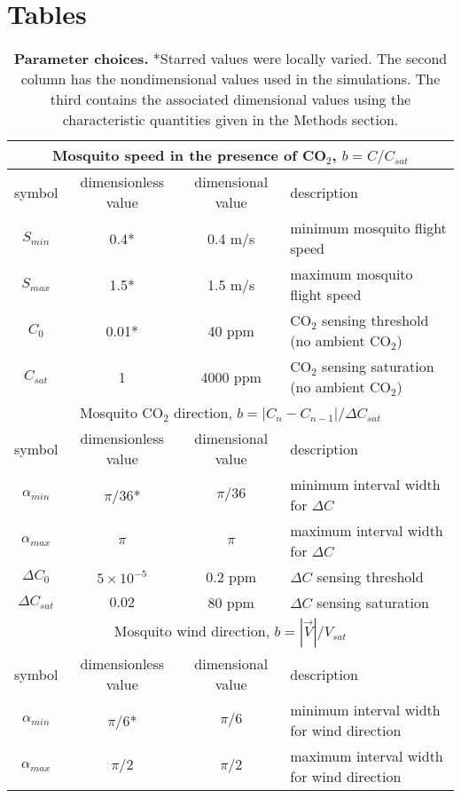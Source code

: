 \documentclass[10pt]{article}
\begin{document}
\newpage
\section*{Tables}
		
\begin{table}[!htp]
\caption{
{\bf Parameter choices.} *Starred values were locally varied. The second column has the nondimensional values used in the simulations. The third contains the associated dimensional values using the characteristic quantities given in the Methods section.}
	\begin{center}
		\begin{tabular}{|c|c|c|l|}
			\hline
			\multicolumn{4}{|c|}{Mosquito speed in the presence of CO$_2$, $b=C/C_{sat}$} \\
			\hline 
			symbol & dimensionless value & dimensional value & description \\
			\hline
			$S_{min}$ & 0.4* & 0.4 m/s & minimum mosquito flight speed\\
			$S_{max}$ & 1.5* & 1.5 m/s & maximum mosquito flight speed\\
			$C_0$ & 0.01* & 40 ppm & CO$_2$ sensing threshold (no ambient CO$_2$)\\
			$C_{sat}$ & 1 & 4000 ppm & CO$_2$ sensing saturation (no ambient CO$_2$)\\
			\hline \hline
			\multicolumn{4}{|c|}{Mosquito CO$_2$ direction, $b=|C_{n}-C_{n-1}|/\Delta C_{sat}$} \\
			\hline 
			symbol & dimensionless value & dimensional value & description \\
			\hline
			$\alpha_{min}$ & $\pi/36$* & $\pi/36$ & minimum interval width for $\Delta C$\\
			$\alpha_{max}$ & $\pi$  & $\pi$ & maximum interval width for $\Delta C$\\
			$\Delta C_0$ & $5\times10^{-5}$  & 0.2 ppm & $\Delta C$ sensing threshold\\
			$\Delta C_{sat}$ & $0.02$  & 80 ppm & $\Delta C$ sensing saturation\\
			\hline \hline
			\multicolumn{4}{|c|}{Mosquito wind direction, $b=|\vec{V}|/V_{sat}$} \\
			\hline 
			symbol & dimensionless value & dimensional value & description \\
			 \hline
			$\alpha_{min}$ & $\pi/6$* & $\pi/6$ & minimum interval width for wind direction \\
			$\alpha_{max}$ & $\pi/2$ & $\pi/2$ & maximum interval width for wind direction \\

\end{tabular}
\end{center}
\end{table}
\end{document}
